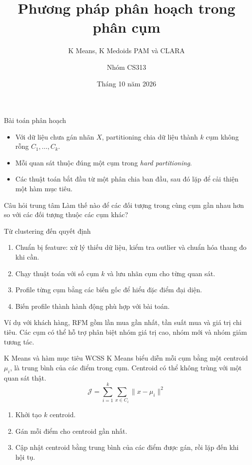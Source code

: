 \documentclass[aspectratio=169,11pt]{beamer}
\title{Phương pháp phân hoạch trong phân cụm}
\subtitle{K Means, K Medoids PAM và CLARA}
\author{Nhóm CS313}
\institute{Khai thác dữ liệu và ứng dụng}
\date{Tháng 10 năm 2026}
\begin{document}
\begin{frame}
  \titlepage
\end{frame}

\begin{frame}{Bài toán phân hoạch}
\begin{itemize}
  \item Với dữ liệu chưa gán nhãn $X$, partitioning chia dữ liệu thành $k$ cụm không rỗng $C_1, \ldots, C_k$.
  \item Mỗi quan sát thuộc đúng một cụm trong \emph{hard partitioning}.
  \item Các thuật toán bắt đầu từ một phân chia ban đầu, sau đó lặp để cải thiện một hàm mục tiêu.
\end{itemize}
\vspace{0.4em}
\begin{block}{Câu hỏi trung tâm}
Làm thế nào để các đối tượng trong cùng cụm gần nhau hơn so với các đối tượng thuộc các cụm khác?
\end{block}
\end{frame}

\begin{frame}{Từ clustering đến quyết định}
\begin{enumerate}
  \item Chuẩn bị feature: xử lý thiếu dữ liệu, kiểm tra outlier và chuẩn hóa thang đo khi cần.
  \item Chạy thuật toán với số cụm $k$ và lưu nhãn cụm cho từng quan sát.
  \item Profile từng cụm bằng các biến gốc để hiểu đặc điểm đại diện.
  \item Biến profile thành hành động phù hợp với bài toán.
\end{enumerate}
\vspace{0.5em}
Ví dụ với khách hàng, RFM gồm lần mua gần nhất, tần suất mua và giá trị chi tiêu. Các cụm có thể hỗ trợ phân biệt nhóm giá trị cao, nhóm mới và nhóm giảm tương tác.
\end{frame}

\begin{frame}{K Means và hàm mục tiêu WCSS}
K Means biểu diễn mỗi cụm bằng một \alert{centroid} $\mu_i$, là trung bình của các điểm trong cụm. Centroid có thể không trùng với một quan sát thật.
\[
\mathcal{J} = \sum_{i=1}^{k}\sum_{x \in C_i} \lVert x-\mu_i \rVert^2
\]
\begin{enumerate}
  \item Khởi tạo $k$ centroid.
  \item Gán mỗi điểm cho centroid gần nhất.
  \item Cập nhật centroid bằng trung bình của các điểm được gán, rồi lặp đến khi hội tụ.
\end{enumerate}
\end{frame}
\end{document}
